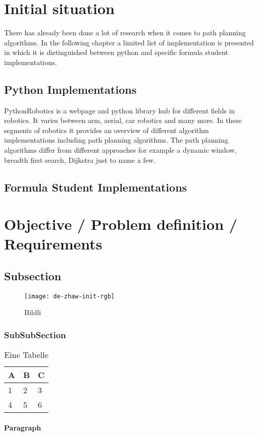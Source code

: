 \section{Initial situation}
There has already been done a lot of research when it comes to path planning algorithms. In the following chapter a limited list of implementation is presented in which it is distinguished between python and specific formula student implementations.

\subsection{Python Implementations}
PythonRobotics is a webpage and python library hub for different fields in robotics. It varies between arm, aerial, car robotics and many more.
In these segments of robotics it provides an overview of different algorithm implementations including path planning algorithms.
The path planning algorithms differ from different approaches for example a dynamic window, breadth first search, Dijkstra just to name a few.


\subsection{Formula Student Implementations}


\section{Objective / Problem definition / Requirements}
\lipsum[1] \cite{quelle2}

\subsection{Subsection}
\lipsum[1] \cite{quelle1}

\begin{figure}[H]
\centering
\texttt{[image: de-zhaw-init-rgb]}
\caption{Bildli}
\label{fig:bildli1}
\end{figure}


\subsubsection{SubSubSection}
\lipsum[1]
\begin{table}[H]
\centering
\caption{Eine Tabelle}
\label{tab:my-table}
\begin{tabular}{|l|l|l|}
\hline
\textbf{A} & \textbf{B} & \textbf{C} \\ \hline
1          & 2          & 3          \\ \hline
4          & 5          & 6          \\ \hline
\end{tabular}
\end{table}

\paragraph{Paragraph}
\lipsum[1]

 


